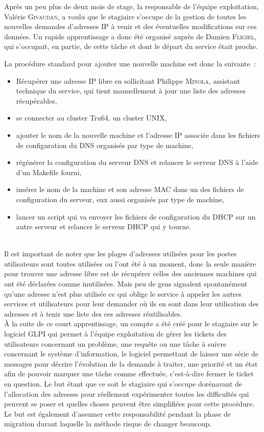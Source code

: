 \documentclass[12pt,a4paper,twoside]{report}
\begin{document}
Après un peu plus de deux mois de stage, la responsable de l’équipe
exploitation, Valérie \textsc{Givaudan}, a voulu que le stagiaire s’occupe de
la gestion de toutes les nouvelles demandes d’adresses IP à venir et des
éventuelles modifications sur ces données. Un rapide apprentissage a donc été
organisé auprès de Damien \textsc{Fligiel}, qui s’occupait, en partie, de cette
tâche et dont le départ du service était proche.

La procédure standard pour ajouter une nouvelle machine est donc la suivante~:

\begin{itemize}
	\item Récupérer une adresse IP libre en sollicitant Philippe
	\textsc{Minola}, assistant technique du service, qui tient manuellement à
	jour une liste des adresses récupérables,
	\item se connecter au cluster Tru64, un cluster UNIX,
	\item ajouter le nom de la nouvelle machine et l’adresse IP associée dans
	les fichiers de configuration du DNS organisés par type de machine,
	\item régénérer la configuration du serveur DNS et relancer le serveur DNS
	à l’aide d’un Makefile fourni,
	\item insérer le nom de la machine et son adresse MAC dans un des fichiers
	de configuration du serveur, eux aussi organisés par type de machine,
	\item lancer un script qui va envoyer les fichiers de configuration du DHCP
	sur un autre serveur et relancer le serveur DHCP qui y tourne.
\end{itemize}
~\\

Il est important de noter que les plages d’adresses utilisées pour les postes
utilisateurs sont toutes utilisées ou l’ont été à un moment, donc la seule
manière pour trouver une adresse libre est de récupérer celles des anciennes
machines qui ont été déclarées comme inutilisées. Mais peu de gens signalent
spontanément qu’une adresse n’est plus utilisée ce qui oblige le service à
appeler les autres services et utilisateurs pour leur demander où ils en sont
dans leur utilisation des adresses et à tenir une liste des ces adresses
réutilisables.\\

À la suite de ce court apprentissage, un compte a été créé pour le stagiaire
sur le logiciel GLPI qui permet à l’équipe exploitation de gérer les tickets
des utilisateurs concernant un problème, une requête ou une tâche à suivre
concernant le système d’information, le logiciel permettant de laisser une
série de messages pour décrire l’évolution de la demande à traiter, une
priorité et un état afin de pouvoir marquer une tâche comme effectuée,
c’est-à-dire fermer le ticket en question. Le but étant que ce soit le
stagiaire qui s’occupe dorénavant de l’allocation des adresses pour réellement
expérimenter toutes les difficultés qui peuvent se poser et quelles choses
peuvent être simplifiées pour cette procédure. Le but est également d’assumer
cette responsabilité pendant la phase de migration durant laquelle la méthode
risque de changer beaucoup.
\end{document}
